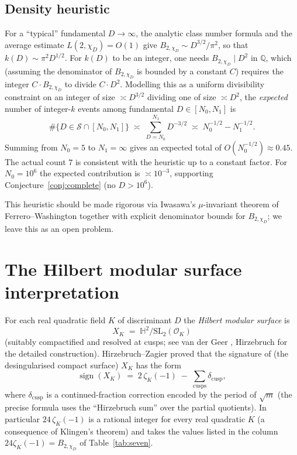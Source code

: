 \documentclass[11pt,reqno]{amsart}
\theoremstyle{plain}
\theoremstyle{definition}
\DeclareMathOperator{\sign}{sign}
\newcommand{\Q}{\mathbb{Q}}
\newcommand{\HH}{\mathbb{H}}
\newcommand{\OK}{\mathcal{O}_K}
\begin{document}
\subsection{Density heuristic}\label{ssec:density}
For a ``typical'' fundamental $D\to\infty$, the analytic class number
formula and the average estimate $L(2,\chi_{D})=O(1)$
\cite{Davenport2000} give $B_{2,\chi_{D}}\sim D^{3/2}/\pi^{2}$, so that
$k(D)\sim\pi^{2}D^{1/2}$.  For $k(D)$ to be an integer, one needs
$B_{2,\chi_{D}}\mid D^{2}$ in $\Q$, which (assuming the denominator of
$B_{2,\chi_{D}}$ is bounded by a constant $C$) requires the integer
$C\cdot B_{2,\chi_{D}}$ to divide $C\cdot D^{2}$.  Modelling this as
a uniform divisibility constraint on an integer of size
$\asymp D^{3/2}$ dividing one of size $\asymp D^{2}$, the
\emph{expected} number of integer-$k$ events among fundamental
$D\in[N_{0},N_{1}]$ is
\[
\#\{D\in\mathcal{S}\cap[N_{0},N_{1}]\}\;\asymp\;\sum_{D=N_{0}}^{N_{1}}D^{-3/2}\;\asymp\;N_{0}^{-1/2}-N_{1}^{-1/2}.
\]
Summing from $N_{0}=5$ to $N_{1}=\infty$ gives an expected total of
$O(N_{0}^{-1/2})\approx 0.45$.  The actual count $7$ is consistent
with the heuristic up to a constant factor.  For $N_{0}=10^{6}$ the
expected contribution is $\asymp 10^{-3}$, supporting
Conjecture~\ref{conj:complete} (no $D>10^{6}$).

This heuristic should be made rigorous via Iwasawa's
$\mu$-invariant theorem of Ferrero--Washington \cite{FerreroWashington1979}
together with explicit denominator bounds for $B_{2,\chi_{D}}$; we leave
this as an open problem.

\section{The Hilbert modular surface interpretation}\label{sec:hms}

For each real quadratic field $K$ of discriminant $D$ the
\emph{Hilbert modular surface} is
\[
X_{K}\;=\;\HH^{2}/\mathrm{SL}_{2}(\OK)
\]
(suitably compactified and resolved at cusps; see van der Geer
\cite{vanderGeer1988}, Hirzebruch \cite{Hirzebruch1973} for the
detailed construction).  Hirzebruch--Zagier
\cite{HirzebruchZagier1976} proved that the signature of (the
desingularised compact surface) $X_{K}$ has the form
\begin{equation}\label{eq:HZ-signature}
\sign(X_{K})\;=\;2\,\zeta_{K}(-1)\;-\;\sum_{\text{cusps}}\delta_{\text{cusp}},
\end{equation}
where $\delta_{\text{cusp}}$ is a continued-fraction correction
encoded by the period of $\sqrt{m}$ (the precise formula uses the
``Hirzebruch sum'' over the partial quotients).  In particular
$24\,\zeta_{K}(-1)$ is a rational integer for every real quadratic $K$
(a consequence of Klingen's theorem) and takes the values listed in
the column $24\zeta_{K}(-1)=B_{2,\chi_{D}}$ of Table~\ref{tab:seven}.
\end{document}
